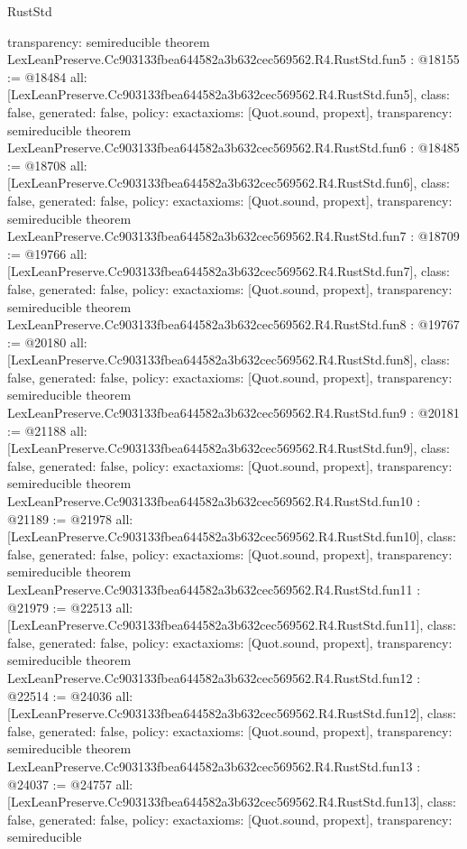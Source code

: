 \begin{lexlean}{RustStd}
\begin{coremodule}
{  transparency: semireducible
}
theorem LexLeanPreserve.Cc903133fbea644582a3b632cec569562.R4.RustStd.fun5 : @18155 := @18484 {
  all: [LexLeanPreserve.Cc903133fbea644582a3b632cec569562.R4.RustStd.fun5],
  class: false,
  generated: false,
  policy: exact{axioms: [Quot.sound, propext]},
  transparency: semireducible
}
theorem LexLeanPreserve.Cc903133fbea644582a3b632cec569562.R4.RustStd.fun6 : @18485 := @18708 {
  all: [LexLeanPreserve.Cc903133fbea644582a3b632cec569562.R4.RustStd.fun6],
  class: false,
  generated: false,
  policy: exact{axioms: [Quot.sound, propext]},
  transparency: semireducible
}
theorem LexLeanPreserve.Cc903133fbea644582a3b632cec569562.R4.RustStd.fun7 : @18709 := @19766 {
  all: [LexLeanPreserve.Cc903133fbea644582a3b632cec569562.R4.RustStd.fun7],
  class: false,
  generated: false,
  policy: exact{axioms: [Quot.sound, propext]},
  transparency: semireducible
}
theorem LexLeanPreserve.Cc903133fbea644582a3b632cec569562.R4.RustStd.fun8 : @19767 := @20180 {
  all: [LexLeanPreserve.Cc903133fbea644582a3b632cec569562.R4.RustStd.fun8],
  class: false,
  generated: false,
  policy: exact{axioms: [Quot.sound, propext]},
  transparency: semireducible
}
theorem LexLeanPreserve.Cc903133fbea644582a3b632cec569562.R4.RustStd.fun9 : @20181 := @21188 {
  all: [LexLeanPreserve.Cc903133fbea644582a3b632cec569562.R4.RustStd.fun9],
  class: false,
  generated: false,
  policy: exact{axioms: [Quot.sound, propext]},
  transparency: semireducible
}
theorem LexLeanPreserve.Cc903133fbea644582a3b632cec569562.R4.RustStd.fun10 : @21189 := @21978 {
  all: [LexLeanPreserve.Cc903133fbea644582a3b632cec569562.R4.RustStd.fun10],
  class: false,
  generated: false,
  policy: exact{axioms: [Quot.sound, propext]},
  transparency: semireducible
}
theorem LexLeanPreserve.Cc903133fbea644582a3b632cec569562.R4.RustStd.fun11 : @21979 := @22513 {
  all: [LexLeanPreserve.Cc903133fbea644582a3b632cec569562.R4.RustStd.fun11],
  class: false,
  generated: false,
  policy: exact{axioms: [Quot.sound, propext]},
  transparency: semireducible
}
theorem LexLeanPreserve.Cc903133fbea644582a3b632cec569562.R4.RustStd.fun12 : @22514 := @24036 {
  all: [LexLeanPreserve.Cc903133fbea644582a3b632cec569562.R4.RustStd.fun12],
  class: false,
  generated: false,
  policy: exact{axioms: [Quot.sound, propext]},
  transparency: semireducible
}
theorem LexLeanPreserve.Cc903133fbea644582a3b632cec569562.R4.RustStd.fun13 : @24037 := @24757 {
  all: [LexLeanPreserve.Cc903133fbea644582a3b632cec569562.R4.RustStd.fun13],
  class: false,
  generated: false,
  policy: exact{axioms: [Quot.sound, propext]},
  transparency: semireducible
}
\end{coremodule}
\end{lexlean}
